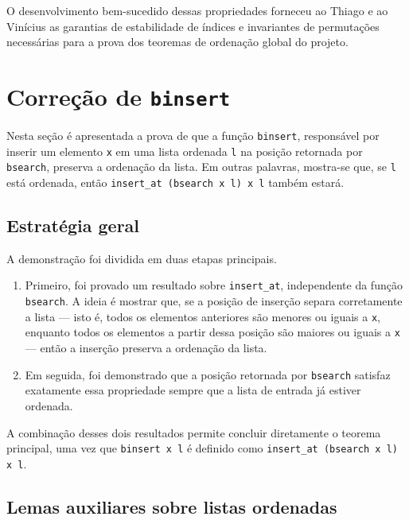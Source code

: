\documentclass{article}
\begin{document}
O desenvolvimento bem-sucedido dessas propriedades forneceu ao Thiago e ao Vinícius as garantias de estabilidade de índices e invariantes de permutações necessárias para a prova dos teoremas de ordenação global do projeto.

\section{Correção de \texttt{binsert}}
\label{sec:thiago}

Nesta seção é apresentada a prova de que a função \texttt{binsert}, responsável
por inserir um elemento \texttt{x} em uma lista ordenada \texttt{l} na posição
retornada por \texttt{bsearch}, preserva a ordenação da lista. Em outras
palavras, mostra-se que, se \texttt{l} está ordenada, então
\texttt{insert\_at (bsearch x l) x l} também estará.

\subsection{Estratégia geral}

A demonstração foi dividida em duas etapas principais.

\begin{enumerate}
  \item Primeiro, foi provado um resultado sobre \texttt{insert\_at},
        independente da função \texttt{bsearch}. A ideia é mostrar que,
        se a posição de inserção separa corretamente a lista --- isto é,
        todos os elementos anteriores são menores ou iguais a
        \texttt{x}, enquanto todos os elementos a partir dessa posição são
        maiores ou iguais a \texttt{x} --- então a inserção preserva a
        ordenação da lista.

  \item Em seguida, foi demonstrado que a posição retornada por
        \texttt{bsearch} satisfaz exatamente essa propriedade sempre que a
        lista de entrada já estiver ordenada.
\end{enumerate}

A combinação desses dois resultados permite concluir diretamente o teorema
principal, uma vez que \texttt{binsert x l} é definido como
\texttt{insert\_at (bsearch x l) x l}.

\subsection{Lemas auxiliares sobre listas ordenadas}
\end{document}
